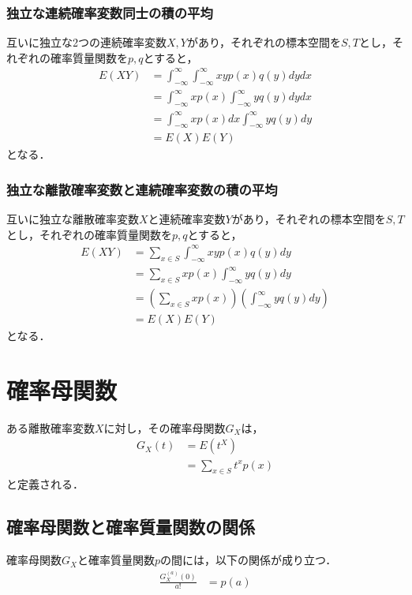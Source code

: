 \documentclass[dvipdfmx]{jsarticle}
\begin{document}
 \subsubsection{独立な連続確率変数同士の積の平均}
互いに独立な2つの連続確率変数$X,Y$があり，それぞれの標本空間を$S,T$とし，それぞれの確率質量関数を$p,q$とすると，
 \begin{align}
  E\left(XY\right)&=\int_{-\infty}^\infty\int_{-\infty}^\infty xyp\left(x\right)q\left(y\right)dydx\nonumber\\
  &=\int_{-\infty}^\infty xp\left(x\right)\int_{-\infty}^\infty yq\left(y\right)dydx\nonumber\\
  &=\int_{-\infty}^\infty xp\left(x\right)dx\int_{-\infty}^\infty yq\left(y\right)dy\nonumber\\
  &=E\left(X\right)E\left(Y\right)
 \end{align}
となる．
 \subsubsection{独立な離散確率変数と連続確率変数の積の平均}
互いに独立な離散確率変数$X$と連続確率変数$Y$があり，それぞれの標本空間を$S,T$とし，それぞれの確率質量関数を$p,q$とすると，
 \begin{align}
  E\left(XY\right)&=\sum_{x\in S}\int_{-\infty}^\infty xyp\left(x\right)q\left(y\right)dy\nonumber\\
  &=\sum_{x\in S}xp\left(x\right)\int_{-\infty}^\infty yq\left(y\right)dy\nonumber\\
  &=\left(\sum_{x\in S}xp\left(x\right)\right)\left(\int_{-\infty}^\infty yq\left(y\right)dy\right)\nonumber\\
  &=E\left(X\right)E\left(Y\right)
 \end{align}
となる．
 \section{確率母関数}
ある離散確率変数$X$に対し，その確率母関数$G_X$は，
 \begin{align}
  G_X\left(t\right)&=E\left(t^X\right)\nonumber\\
  &=\sum_{x\in S}t^xp\left(x\right)
 \end{align}
と定義される．
 \subsection{確率母関数と確率質量関数の関係}
確率母関数$G_X$と確率質量関数$p$の間には，以下の関係が成り立つ．
 \begin{align}
  \frac{G_X^{\left(a\right)}\left(0\right)}{a!}&=p\left(a\right)
 \end{align}
\end{document}
